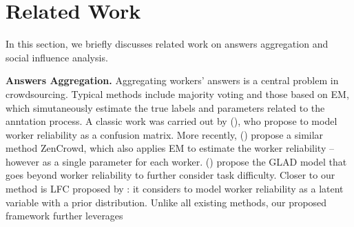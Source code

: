 \section{Related Work}

In this section, we briefly discusses related work on answers aggregation and social influence analysis.

\smallskip
\noindent\textbf{Answers Aggregation.} Aggregating workers' answers is a central problem in crowdsourcing. Typical methods include majority voting \cite{sheng2008get} and those based on EM, which simutaneously estimate the true labels and parameters related to the anntation process. A classic work was carried out by \citeauthor{dawid1979maximum} (\citeyear{dawid1979maximum}), who propose to model worker reliability as a confusion matrix. More recently, \citeauthor{demartini2012zencrowd} (\citeyear{demartini2012zencrowd}) propose a similar method ZenCrowd, which also applies EM to estimate the worker reliability -- however as a single parameter for each worker. \citeauthor{whitehill2009whose} (\citeyear{whitehill2009whose}) propose the GLAD model that goes beyond worker reliability to further consider task difficulty. Closer to our method is LFC proposed by \citeauthor{raykar2010learning}: it considers to model worker reliability as a latent variable with a prior distribution. Unlike all existing methods, our proposed framework further leverages 


